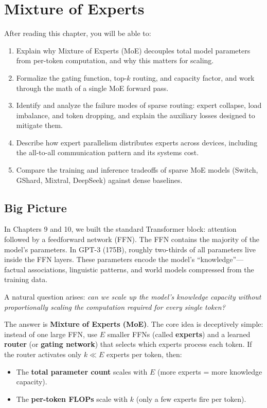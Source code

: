 \chapter{Mixture of Experts}
\label{ch:13}

\begin{keyinsight}
After reading this chapter, you will be able to:
\begin{enumerate}
  \item Explain why Mixture of Experts (MoE) decouples total model parameters from per-token computation, and why this matters for scaling.
  \item Formalize the gating function, top-$k$ routing, and capacity factor, and work through the math of a single MoE forward pass.
  \item Identify and analyze the failure modes of sparse routing: expert collapse, load imbalance, and token dropping, and explain the auxiliary losses designed to mitigate them.
  \item Describe how expert parallelism distributes experts across devices, including the all-to-all communication pattern and its systems cost.
  \item Compare the training and inference tradeoffs of sparse MoE models (Switch, GShard, Mixtral, DeepSeek) against dense baselines.
\end{enumerate}
\end{keyinsight}

\section{Big Picture}
\label{ch:13:sec:big_picture}

In Chapters 9 and 10, we built the standard Transformer block: attention followed by a feedforward network (FFN). The FFN contains the majority of the model's parameters. In GPT-3 (175B), roughly two-thirds of all parameters live inside the FFN layers. These parameters encode the model's ``knowledge''---factual associations, linguistic patterns, and world models compressed from the training data.

A natural question arises: \emph{can we scale up the model's knowledge capacity without proportionally scaling the computation required for every single token?}

The answer is \textbf{Mixture of Experts (MoE)}. The core idea is deceptively simple: instead of one large FFN, use $E$ smaller FFNs (called \textbf{experts}) and a learned \textbf{router} (or \textbf{gating network}) that selects which experts process each token. If the router activates only $k \ll E$ experts per token, then:
\begin{itemize}
  \item The \textbf{total parameter count} scales with $E$ (more experts = more knowledge capacity).
  \item The \textbf{per-token FLOPs} scale with $k$ (only a few experts fire per token).
\end{itemize}

